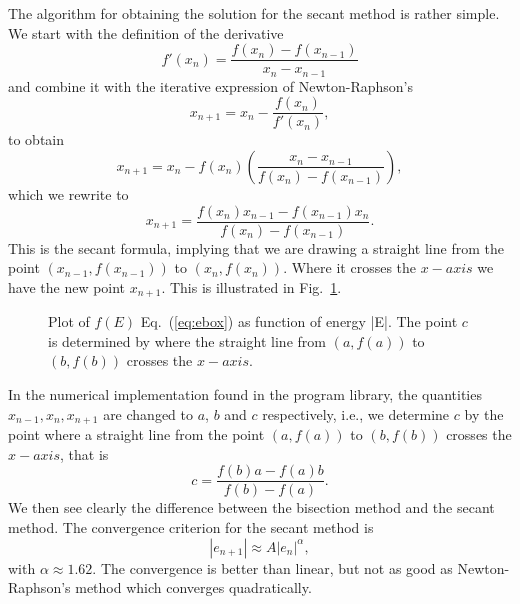 The algorithm for obtaining the solution 
for the secant method is rather simple. We start with the definition
of the derivative
\[
   f'(x_n)=\frac{f(x_n)-f(x_{n-1})}{x_n-x_{n-1}}
\]
and combine it with the iterative expression of Newton-Raphson's 
\[
   x_{n+1}=x_n-\frac{f(x_n)}{f'(x_n)},
\]
to obtain 
\[
   x_{n+1}=x_n-f(x_n)\left(\frac{x_n-x_{n-1}}{f(x_n)-f(x_{n-1})}\right),
\]
which we rewrite to
\[
   x_{n+1}=\frac{f(x_n)x_{n-1}-f(x_{n-1})x_n}{f(x_n)-f(x_{n-1})}.
\]
This is the secant formula, implying that we are drawing a straight line
from the point $(x_{n-1},f(x_{n-1}))$ to $(x_n,f(x_n))$. Where
it crosses the $x-axis$ we have the new point $x_{n+1}$. 
This is illustrated in Fig.\  \ref{fig:chap8fig2}.
\begin{figure}
%   
   \caption{Plot of $f(E)$ Eq.\ (\ref{eq:ebox}) as function of energy |E|. 
            The point  
            $c$ is determined by where the straight line from $(a,f(a))$ 
            to $(b,f(b))$ crosses the $x-axis$.}
   \label{fig:chap8fig2}
\end{figure}

In the numerical implementation found in the program library, the 
quantities $x_{n-1}, x_n, x_{n+1}$ are changed to 
$a$, $b$ and $c$ respectively, i.e.,
we determine $c$ by the point where a straight line
from the point $(a,f(a))$ to $(b,f(b))$ crosses the $x-axis$, that is
\[
   c=\frac{f(b)a-f(a)b}{f(b)-f(a)}.
\]
We then see clearly the difference between the bisection method and the 
secant method. The convergence criterion for the secant method is
\[
   |e_{n+1}| \approx A|e_n|^{\alpha},
\]
with $\alpha\approx 1.62$. The convergence is better than linear, but not as
good as Newton-Raphson's method which converges quadratically. 


